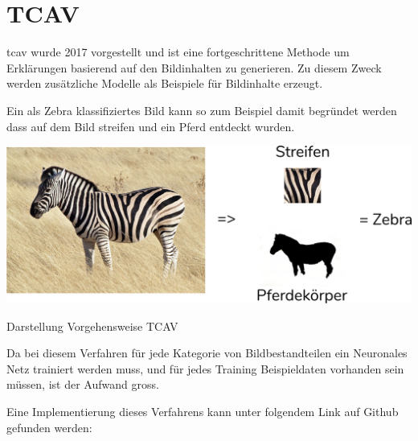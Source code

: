 \documentclass[
  12pt, %
  a4paper, %
  oneside, %
  openany, 
  numbers=noenddot, %
  BCOR=5mm, %
  parskip=half*, %
  thesis, %
]{bfhbook}
\begin{document}
\section{TCAV}
 \acrfull{tcav} wurde 2017 vorgestellt \parencite{Kim2017} und ist eine fortgeschrittene Methode um Erklärungen basierend auf den Bildinhalten zu generieren. Zu diesem Zweck werden zusätzliche Modelle als Beispiele für Bildinhalte erzeugt.
 
\break
 Ein als Zebra klassifiziertes Bild kann so zum Beispiel damit begründet werden dass auf dem Bild streifen und ein Pferd entdeckt wurden.
\begin{center}
\begin{minipage}[t]{\linewidth}
\includegraphics[width=\textwidth]{Bilder/Zebra-Explanation.PNG}
\caption{Darstellung Vorgehensweise TCAV}
\end{minipage}
\end{center}
Da bei diesem Verfahren für jede Kategorie von Bildbestandteilen ein Neuronales Netz trainiert werden muss, und für jedes Training Beispieldaten vorhanden sein müssen, ist der Aufwand gross. 

Eine Implementierung dieses Verfahrens kann unter folgendem Link auf Github gefunden werden: \cite{tcavLink}
\end{document}

